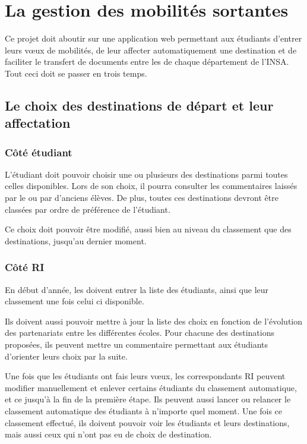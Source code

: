 
		\section{La gestion des mobilités sortantes}
		\label{sec::gestion_mobilite}
		
		Ce projet doit aboutir sur une application web permettant aux étudiants d'entrer leurs vœux de mobilités, de leur affecter automatiquement une destination et de faciliter le transfert de documents entre les \ris de chaque département de l'INSA. Tout ceci doit se passer en trois temps.
		
		 \subsection{Le choix des destinations de départ et leur affectation}
		 
		 \subsubsection{Côté étudiant}
		 
		 L'étudiant doit pouvoir choisir une ou plusieurs des destinations parmi toutes celles disponibles. Lors de son choix, il pourra consulter les commentaires laissés par le \ri ou par d'anciens élèves. De plus, toutes ces destinations devront être classées par ordre de préférence de l'étudiant.
		 
		 Ce choix doit pouvoir être modifié, aussi bien au niveau du classement que des destinations, jusqu'au dernier moment.
		 
		\subsubsection{Côté RI}
		
		En début d'année, les \ris doivent entrer la liste des étudiants, ainsi que leur classement une fois celui ci disponible. 
		
		Ils doivent aussi pouvoir mettre à jour la liste des choix en fonction de l'évolution des partenariats entre les différentes écoles. Pour chacune des destinations proposées, ils peuvent mettre un commentaire permettant aux étudiants d'orienter leurs choix par la suite.
		
		Une fois que les étudiants ont fais leurs vœux, les correspondants RI peuvent modifier manuellement et enlever certains étudiants du classement automatique, et ce jusqu'à la fin de la première étape. Ils peuvent aussi lancer ou relancer le classement automatique des étudiants à n'importe quel moment. Une fois ce classement effectué, ils doivent pouvoir voir les étudiants et leurs destinations, mais aussi ceux qui n'ont pas eu de choix de destination.
		

